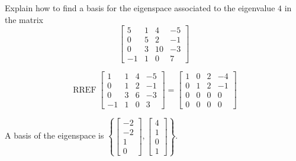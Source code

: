 
\begin{exerciseStatement}


Explain how to find a basis for the eigenspace associated to the eigenvalue \( 4 \) in the matrix \[ \left[\begin{array}{cccc}
5 & 1 & 4 & -5 \\
0 & 5 & 2 & -1 \\
0 & 3 & 10 & -3 \\
-1 & 1 & 0 & 7
\end{array}\right] \]


\end{exerciseStatement}
    
\begin{exerciseAnswer} 


\[\operatorname{RREF} \left[\begin{array}{cccc}
1 & 1 & 4 & -5 \\
0 & 1 & 2 & -1 \\
0 & 3 & 6 & -3 \\
-1 & 1 & 0 & 3
\end{array}\right] = \left[\begin{array}{cccc}
1 & 0 & 2 & -4 \\
0 & 1 & 2 & -1 \\
0 & 0 & 0 & 0 \\
0 & 0 & 0 & 0
\end{array}\right] \]



A basis of the eigenspace is \( \left\{ \left[\begin{array}{c}
-2 \\
-2 \\
1 \\
0
\end{array}\right] , \left[\begin{array}{c}
4 \\
1 \\
0 \\
1
\end{array}\right] \right\} \).


\end{exerciseAnswer}
    
